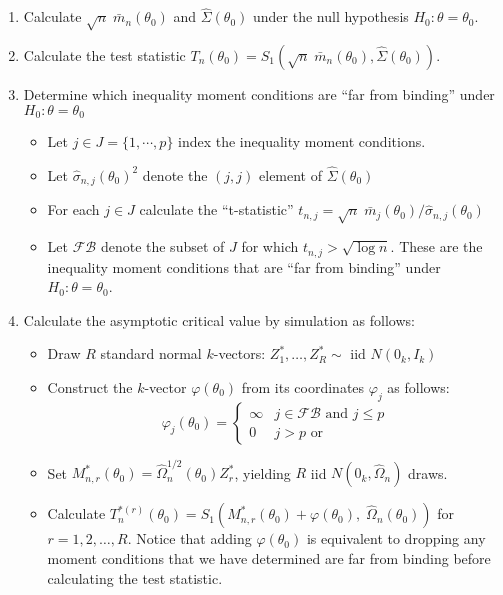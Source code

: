 \documentclass[12pt]{article}
\begin{document}
\begin{enumerate}
  \item Calculate $\sqrt{n}\; \bar{m}_n\left( \theta_0 \right)$ and $\widehat{\Sigma}(\theta_0)$ under the null hypothesis $H_0\colon \theta = \theta_0$.
  \item Calculate the test statistic $T_n(\theta_0) = S_1\left(\sqrt{n}\; \bar{m}_n\left( \theta_0 \right), \widehat{\Sigma}\left( \theta_0 \right)  \right)$.
  \item Determine which inequality moment conditions are ``far from binding'' under $H_0\colon \theta = \theta_0$
    \begin{itemize}
      \item Let $j \in J = \{ 1, \cdots, p\}$ index the inequality moment conditions.
      \item Let $\widehat{\sigma}_{n,j}(\theta_0)^2$ denote the $(j,j)$ element of $\widehat{\Sigma}(\theta_0)$
      \item For each $j\in J$ calculate the ``t-statistic'' $ t_{n,j} = \sqrt{n}\; \bar{m}_j(\theta_0)/\widehat{\sigma}_{n,j}(\theta_0)$
      \item Let $\mathcal{FB}$ denote the subset of $J$ for which $t_{n,j} >\sqrt{\log n}$.
        These are the inequality moment conditions that are ``far from binding'' under $H_0\colon\theta = \theta_0$. 
    \end{itemize}
  \item Calculate the asymptotic critical value by simulation as follows:
    \begin{itemize}
      \item Draw $R$ standard normal $k$-vectors: $Z^*_1, \hdots, Z^*_R \sim \mbox{ iid } N(0_k, I_k)$
      \item Construct the $k$-vector $\varphi(\theta_0)$ from its coordinates $\varphi_j$ as follows:
        \[
          \varphi_j(\theta_0) = \left\{
          \begin{array}{ll}
            \infty & j\in \mathcal{FB} \mbox{ and } j\leq p\\
            0 & j>p \mbox{ or } 
          \end{array}
          \right.
        \]
      \item Set $M^*_{n,r}(\theta_0) = \widehat{\Omega}_n^{1/2}(\theta_0) Z_r^*$, yielding $R$ iid $N(0_k, \widehat{\Omega}_n)$ draws.
      \item Calculate $T^{*(r)}_n(\theta_0) = S_1\left(M^*_{n,r}(\theta_0) + \varphi(\theta_0), \;\widehat{\Omega}_n(\theta_0)\right)$ for $r=1, 2, \hdots, R$. Notice that adding $\varphi(\theta_0)$ is equivalent to dropping any moment conditions that we have determined are far from binding before calculating the test statistic.

\end{itemize}
\end{enumerate}
\end{document}
